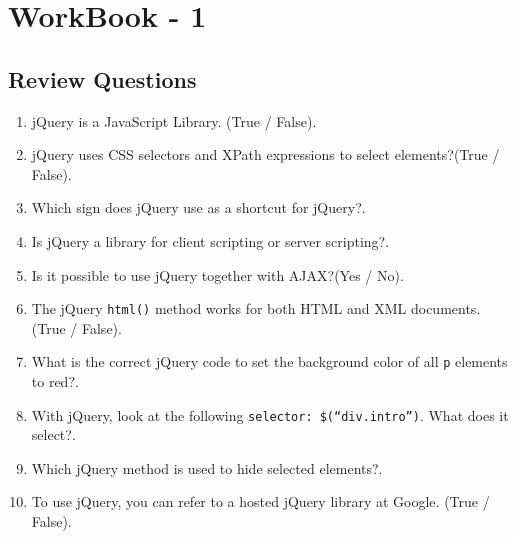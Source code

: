 \documentclass[11pt,a4paper]{article}
\begin{document}
\section*{WorkBook - 1}
\subsection*{Review Questions}
\begin{enumerate}\itemsep10pt
\item jQuery is a JavaScript Library. (True / False)\underline{\hspace{3cm}}.

\item jQuery uses CSS selectors and XPath expressions to select elements?(True / False)\underline{\hspace{3cm}}.

\item Which sign does jQuery use as a shortcut for jQuery?\underline{\hspace{3cm}}.

\item Is jQuery a library for client scripting or server scripting?\underline{\hspace{3cm}}.

\item Is it possible to use jQuery together with AJAX?(Yes / No)\underline{\hspace{3cm}}.

\item The jQuery \texttt{html()} method works for both HTML and XML documents. (True / False)\underline{\hspace{3cm}}.

\item What is the correct jQuery code to set the background color of all \texttt{p} elements to red?\underline{\hspace{3cm}}.

\item With jQuery, look at the following \texttt{selector: \$(``div.intro'')}. What does it select?\underline{\hspace{3cm}}.

\item Which jQuery method is used to hide selected elements?\underline{\hspace{3cm}}.

\item To use jQuery, you can refer to a hosted jQuery library at Google. (True / False)\underline{\hspace{3cm}}.


\end{enumerate}
\end{document}
